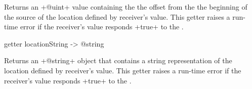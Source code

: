 Returns an \ggs+@uint+ value containing the the offset from the the beginning of the source of the location defined by receiver's value. This getter raises a run-time error if the receiver's value responds \ggs+true+ to the .



\begin{galgas}
getter locationString -> @string
\end{galgas}

Returns an \ggs+@string+ object that contains a string representation of the location defined by receiver's value. This getter raises a run-time error if the receiver's value responds \ggs+true+ to the .
